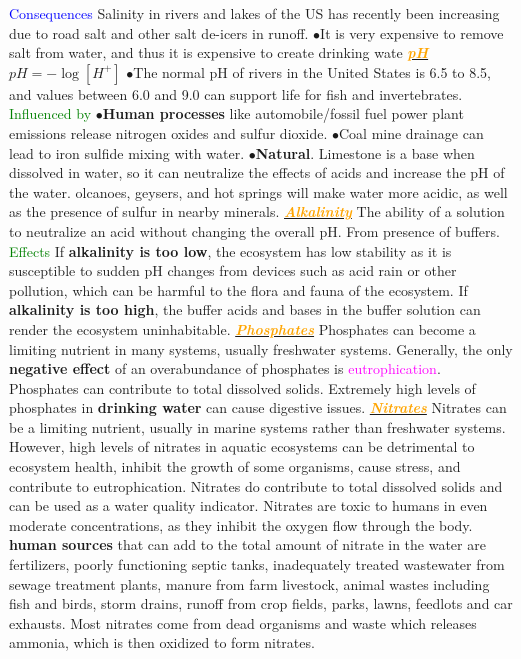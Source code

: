 \documentclass{article}
\newcommand{\ddd}{$\bullet$}
\newcommand{\green}[1]{\textcolor{green}{#1}}
\newcommand{\blue}[1]{\textcolor{blue}{#1}}
\newcommand{\pink}[1]{\textcolor{magenta}{#1}}
\newcommand{\orange}[1]{\textcolor{orange}{#1}}
\newcommand{\mysubsection}[1]{\underline{\textbf{{\textit{\orange{#1}}}}}}
\newcommand{\mysubsub}[1]{{{\green{#1}}}}
\newcommand{\mysubsubsub}[1]{{{\blue{#1}}}}
\begin{document}
\begin{multicols*}{4}
            \mysubsubsub{Consequences}
                Salinity in rivers and lakes of the US has recently been increasing due to road salt and other salt de-icers in runoff. \ddd It is very expensive to remove salt from water, and thus it is expensive to create drinking wate
        \mysubsection{pH}
            $pH = - \log [H^+]$
            \ddd  The normal pH of rivers in the United States is 6.5 to 8.5, and values between 6.0 and 9.0 can support life for fish and invertebrates.
            \mysubsub{Influenced by} 
            \ddd \textbf{Human processes} like automobile/fossil fuel power plant emissions release nitrogen oxides and sulfur dioxide.
            \ddd  Coal mine drainage can lead to iron sulfide mixing with water.
            \ddd \textbf{Natural}. Limestone is a base when dissolved in water, so it can neutralize the effects of acids and increase the pH of the water. olcanoes, geysers, and hot springs will make water more acidic, as well as the presence of sulfur in nearby minerals.
        \mysubsection{Alkalinity}
            The ability of a solution to neutralize an acid without changing the overall pH. From presence of buffers. 
            \mysubsub{Effects} If \textbf{alkalinity is too low}, the ecosystem has low stability as it is susceptible to sudden pH changes from devices such as acid rain or other pollution, which can be harmful to the flora and fauna of the ecosystem. If \textbf{alkalinity is too high}, the buffer acids and bases in the buffer solution can render the ecosystem uninhabitable.
        \mysubsection{Phosphates}
            Phosphates can become a limiting nutrient in many systems, usually freshwater systems. Generally, the only \textbf{negative effect} of an overabundance of phosphates is \pink{eutrophication}. Phosphates can contribute to total dissolved solids. Extremely high levels of phosphates in \textbf{drinking water} can cause digestive issues. 
        \mysubsection{Nitrates}
           Nitrates can be a limiting nutrient, usually in marine systems rather than freshwater systems. However, high levels of nitrates in aquatic ecosystems can be detrimental to ecosystem health, inhibit the growth of some organisms, cause stress, and contribute to eutrophication. Nitrates do contribute to total dissolved solids and can be used as a water quality indicator. Nitrates are toxic to humans in even moderate concentrations, as they inhibit the oxygen flow through the body. \textbf{human sources} that can add to the total amount of nitrate in the water are fertilizers, poorly functioning septic tanks, inadequately treated wastewater from sewage treatment plants, manure from farm livestock, animal wastes including fish and birds, storm drains, runoff from crop fields, parks, lawns, feedlots and car exhausts. Most nitrates come from dead organisms and waste which releases ammonia, which is then oxidized to form nitrates.

\end{multicols*}
\end{document}
